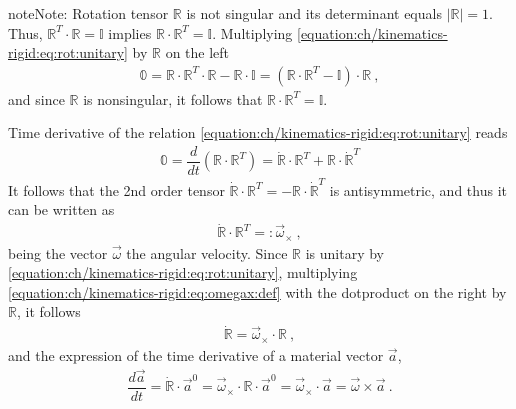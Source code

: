 \documentclass[letterpaper,10pt,english]{jupyterBook}
\begin{document}
\begin{sphinxadmonition}{note}{Note:}
\sphinxAtStartPar
Rotation tensor \(\mathbb{R}\) is not singular and its determinant equals \(|\mathbb{R}| = 1\). Thus, \(\mathbb{R}^T \cdot \mathbb{R} = \mathbb{I}\) implies \(\mathbb{R} \cdot \mathbb{R}^T = \mathbb{I}\). Multiplying \eqref{equation:ch/kinematics-rigid:eq:rot:unitary} by \(\mathbb{R}\) on the left
\begin{equation*}
\begin{split}\mathbb{0} = \mathbb{R} \cdot \mathbb{R}^T \cdot \mathbb{R} - \mathbb{R} \cdot \mathbb{I} = (\mathbb{R} \cdot \mathbb{R}^T - \mathbb{I}) \cdot  \mathbb{R} \ ,\end{split}
\end{equation*}
\sphinxAtStartPar
and since \(\mathbb{R}\) is non\sphinxhyphen{}singular, it follows that \(\mathbb{R} \cdot \mathbb{R}^T = \mathbb{I}\).
\end{sphinxadmonition}

\sphinxAtStartPar
Time derivative of the relation \eqref{equation:ch/kinematics-rigid:eq:rot:unitary} reads
\begin{equation*}
\begin{split}\mathbb{0} = \dfrac{d}{dt} \left( \mathbb{R} \cdot \mathbb{R}^T \right) = \dot{\mathbb{R}} \cdot \mathbb{R}^T + \mathbb{R} \cdot \dot{\mathbb{R}}^T\end{split}
\end{equation*}
\sphinxAtStartPar
It follows that the 2\sphinxhyphen{}nd order tensor \(\dot{\mathbb{R}} \cdot \mathbb{R}^T = - \mathbb{R} \cdot \dot{\mathbb{R}}^T\) is anti\sphinxhyphen{}symmetric, and thus it can be written as
\begin{equation}\label{equation:ch/kinematics-rigid:eq:omegax:def}
\begin{split}\dot{\mathbb{R}} \cdot \mathbb{R}^T =: \vec{\omega}_{\times} \ ,\end{split}
\end{equation}
\sphinxAtStartPar
being the vector \(\vec{\omega}\) the angular velocity. Since \(\mathbb{R}\) is unitary by \eqref{equation:ch/kinematics-rigid:eq:rot:unitary}, multiplying \eqref{equation:ch/kinematics-rigid:eq:omegax:def} with the dot\sphinxhyphen{}product on the right by \(\mathbb{R}\), it follows
\begin{equation*}
\begin{split}\dot{\mathbb{R}} = \vec{\omega}_{\times} \cdot \mathbb{R} \ ,\end{split}
\end{equation*}
\sphinxAtStartPar
and the expression of the time derivative of a material vector \(\vec{a}\),
\begin{equation}\label{equation:ch/kinematics-rigid:eq:material-v:time-derivative}
\begin{split}\dfrac{d \vec{a}}{d t} = \dot{\mathbb{R}} \cdot \vec{a}^0 = \vec{\omega}_{\times} \cdot \mathbb{R} \cdot \vec{a}^0 = \vec{\omega}_{\times} \cdot \vec{a} = \vec{\omega} \times \vec{a} \  .\end{split}
\end{equation}
\end{document}
